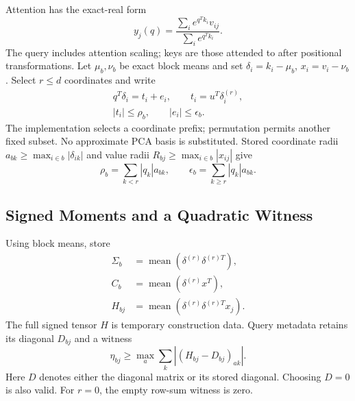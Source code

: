 Attention has the exact-real form
\begin{equation}
 y_j(q)=\frac{\sum_i e^{q^Tk_i}v_{ij}}{\sum_i e^{q^Tk_i}}.
 \label{eq:attention}
\end{equation}
The query includes attention scaling; keys are those attended to after
positional transformations. Let $\mu_b,\nu_b$ be exact block means and set
$\delta_i=k_i-\mu_b$, $x_i=v_i-\nu_b$. Select $r\le d$ coordinates and write
\begin{equation}
 \begin{gathered}
 q^T\delta_i=t_i+e_i,\qquad t_i=u^T\delta_i^{(r)},\\
 |t_i|\le\rho_b,\qquad |e_i|\le\epsilon_b.
 \end{gathered}
 \label{eq:score-split}
\end{equation}
The implementation selects a coordinate prefix; permutation permits another
fixed subset. No approximate PCA basis is substituted. Stored coordinate
radii $a_{bk}\ge\max_{i\in b}|\delta_{ik}|$ and value radii
$R_{bj}\ge\max_{i\in b}|x_{ij}|$ give
\begin{equation}
 \rho_b=\sum_{k<r}|q_k|a_{bk},\qquad
 \epsilon_b=\sum_{k\ge r}|q_k|a_{bk}.
 \label{eq:query-radii}
\end{equation}

\subsection{Signed Moments and a Quadratic Witness}

Using block means, store
\begin{equation}
 \begin{aligned}
 \Sigma_b&=\operatorname{mean}(\delta^{(r)}\delta^{(r)T}),\\
 C_b&=\operatorname{mean}(\delta^{(r)}x^T),\\
 H_{bj}&=\operatorname{mean}(\delta^{(r)}\delta^{(r)T}x_j).
 \end{aligned}
 \label{eq:stored-moments}
\end{equation}
The full signed tensor $H$ is temporary construction data. Query metadata
retains its diagonal $D_{bj}$ and a witness
\begin{equation}
 \eta_{bj}\ge\max_a\sum_k|(H_{bj}-D_{bj})_{ak}|.
 \label{eq:rowsum-witness}
\end{equation}
Here $D$ denotes either the diagonal matrix or its stored diagonal. Choosing
$D=0$ is also valid. For $r=0$, the empty row-sum witness is zero.

